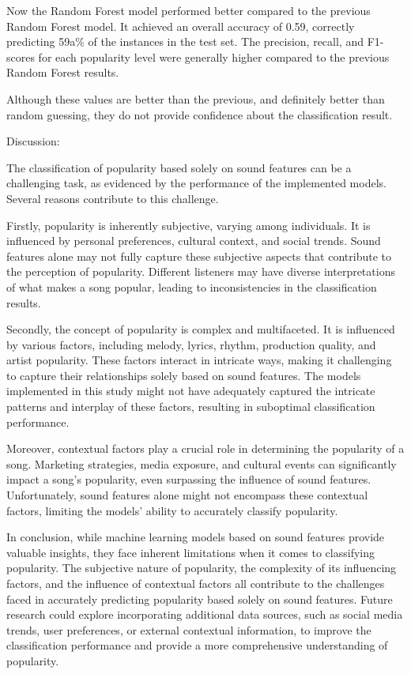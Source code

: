 \documentclass[11pt]{article} %
\begin{document}
Now the Random Forest model performed better compared to the previous Random Forest model. It achieved an overall accuracy of 0.59, correctly predicting 59a\% of the instances in the test set. The precision, recall, and F1-scores for each popularity level were generally higher compared to the previous Random Forest results.

Although these values are better than the previous, and definitely better than random guessing, they do not provide confidence about the classification result. 

\newblock

Discussion:

The classification of popularity based solely on sound features can be a challenging task, as evidenced by the performance of the implemented models. Several reasons contribute to this challenge.

Firstly, popularity is inherently subjective, varying among individuals. It is influenced by personal preferences, cultural context, and social trends. Sound features alone may not fully capture these subjective aspects that contribute to the perception of popularity. Different listeners may have diverse interpretations of what makes a song popular, leading to inconsistencies in the classification results.

Secondly, the concept of popularity is complex and multifaceted. It is influenced by various factors, including melody, lyrics, rhythm, production quality, and artist popularity. These factors interact in intricate ways, making it challenging to capture their relationships solely based on sound features. The models implemented in this study might not have adequately captured the intricate patterns and interplay of these factors, resulting in suboptimal classification performance.

Moreover, contextual factors play a crucial role in determining the popularity of a song. Marketing strategies, media exposure, and cultural events can significantly impact a song's popularity, even surpassing the influence of sound features. Unfortunately, sound features alone might not encompass these contextual factors, limiting the models' ability to accurately classify popularity.

In conclusion, while machine learning models based on sound features provide valuable insights, they face inherent limitations when it comes to classifying popularity. The subjective nature of popularity, the complexity of its influencing factors, and the influence of contextual factors all contribute to the challenges faced in accurately predicting popularity based solely on sound features. Future research could explore incorporating additional data sources, such as social media trends, user preferences, or external contextual information, to improve the classification performance and provide a more comprehensive understanding of popularity.
\end{document}
